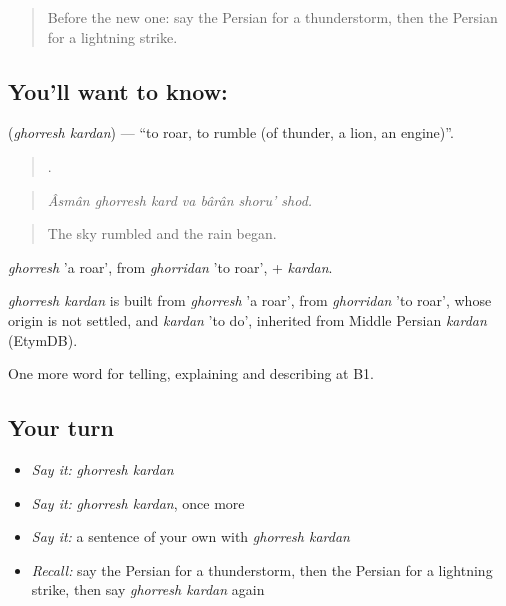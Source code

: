 \label{lesson:FA-C475-ghorresh-kardan}



\begin{quote}
Before the new one: say the Persian for a thunderstorm, then the Persian for a lightning strike.
\end{quote}

\subsection*{You'll want to know:  }
\textbf{ } (\emph{ghorresh kardan}) — \textquotedblleft{}to roar, to rumble (of thunder, a lion, an engine)\textquotedblright{}.

\begin{quote}
      .
\end{quote}

\begin{quote}
\emph{Âsmân ghorresh kard va bârân shoru' shod.}
\end{quote}

\begin{quote}
The sky rumbled and the rain began.
\end{quote}

\emph{ghorresh} 'a roar', from \emph{ghorridan} 'to roar', + \emph{kardan}.

\begin{cousinweb}
\emph{ghorresh kardan} is built from \emph{ghorresh} 'a roar', from \emph{ghorridan} 'to roar', whose origin is not settled, and \emph{kardan} 'to do', inherited from Middle Persian \emph{kardan} (EtymDB).
\end{cousinweb}

\begin{grammarlens}[title={What you've built}]
One more word for telling, explaining and describing at B1.
\end{grammarlens}

\subsection*{Your turn}
\begin{itemize}
\raggedright
  \item \emph{Say it:} \emph{ghorresh kardan}
  \item \emph{Say it:} \emph{ghorresh kardan}, once more
  \item \emph{Say it:} a sentence of your own with \emph{ghorresh kardan}
  \item \emph{Recall:} say the Persian for a thunderstorm, then the Persian for a lightning strike, then say \emph{ghorresh kardan} again
\end{itemize}


